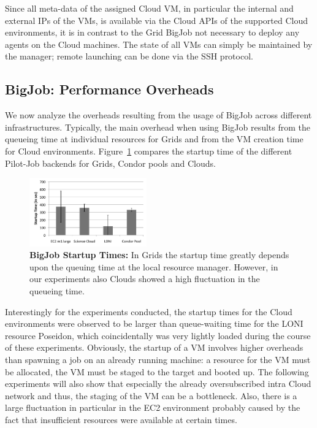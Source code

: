 \documentclass[conference,final]{IEEEtran}
\newcommand{\up}{\vspace*{-1em}}
\newcommand{\alnote}[1]{ {\textcolor{blue} { ***AL: #1 }}}
\newcommand{\jhanote}[1]{ {\textcolor{red} { ***SJ: #1 }}}
\newcommand{\alnote}[1]{}
\newcommand{\jhanote}[1]{}
\begin{document}
Since all meta-data of the assigned Cloud VM, in particular the
internal and external IPs of the VMs, is available via the Cloud APIs
of the supported Cloud environments, it is in contrast to the Grid
BigJob not necessary to deploy any agents on the Cloud machines. The
state of all VMs can simply be maintained by the manager; remote
launching can be done via the SSH protocol.


\subsection{BigJob: Performance Overheads} 
\up


We now analyze the overheads resulting from the usage of BigJob across
different infrastructures. Typically, the main overhead when using
BigJob results from the queueing time at individual resources for
Grids and from the VM creation time for Cloud environments.
Figure~\ref{fig:performance_setup_time} compares the startup time of
the different Pilot-Job backends for Grids, Condor pools and Clouds.

\up
\begin{figure}[htbp]
    \centering
        \includegraphics[width=0.45\textwidth]{performance/setup_time_xls.pdf}
    \caption{\textbf{BigJob Startup Times:} In Grids the startup time
      greatly depends upon the queuing time at the local resource
      manager. However, in our experiments also Clouds showed a high
      fluctuation in the queueing time.\up}
    \label{fig:performance_setup_time}
\end{figure}

Interestingly for the experiments conducted, the startup times for the
Cloud environments were observed to be larger than queue-waiting time
for the LONI resource Poseidon, which coincidentally was very lightly
loaded during the course of these experiments. Obviously, the startup
of a VM involves higher overheads than spawning a job on an already
running machine: a resource for the VM must be allocated, the VM must
be staged to the target and booted up. The following experiments will
also show that especially the already oversubscribed intra Cloud
network and thus, the staging of the VM can be a bottleneck. Also,
there is a large fluctuation in particular in the EC2 environment
probably caused by the fact that insufficient resources were available
at certain times.
\end{document}
